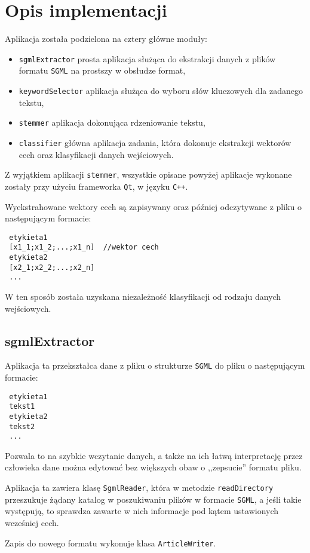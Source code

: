 \documentclass{classrep}
\begin{document}
\section{Opis implementacji}
Aplikacja została podzielona na cztery główne moduły:
\begin{itemize}
 \item \verb|sgmlExtractor| \ppauza prosta aplikacja służąca do ekstrakcji danych z plików formatu \verb|SGML| na prostszy w obsłudze format,
 \item \verb|keywordSelector| \ppauza aplikacja służąca do wyboru słów kluczowych dla zadanego tekstu,
 \item \verb|stemmer| \ppauza aplikacja dokonująca rdzeniowanie tekstu,
 \item \verb|classifier| \ppauza główna aplikacja zadania, która dokonuje ekstrakcji wektorów cech oraz klasyfikacji danych wejściowych.
\end{itemize}
Z wyjątkiem aplikacji \verb|stemmer|, wszystkie opisane powyżej aplikacje wykonane zostały przy użyciu frameworka \verb|Qt|, w języku \verb|C++|.

Wyekstrahowane wektory cech są zapisywany oraz później odczytywane z pliku o następującym formacie:
\begin{verbatim}
 etykieta1
 [x1_1;x1_2;...;x1_n]  //wektor cech
 etykieta2
 [x2_1;x2_2;...;x2_n]
 ...
\end{verbatim}
W ten sposób została uzyskana niezależność klasyfikacji od rodzaju danych wejściowych.


\subsection{sgmlExtractor}
Aplikacja ta przekształca dane z pliku o strukturze \verb|SGML| do pliku o następującym formacie:
\begin{verbatim}
 etykieta1
 tekst1
 etykieta2
 tekst2
 ...
\end{verbatim}
Pozwala to na szybkie wczytanie danych, a także na ich łatwą interpretację przez człowieka \ppauza dane można edytować bez większych obaw o ,,zepsucie'' formatu pliku.

Aplikacja ta zawiera klasę \verb|SgmlReader|, która w metodzie \verb|readDirectory| przeszukuje żądany katalog w poszukiwaniu plików w formacie \verb|SGML|, a jeśli takie występują, to sprawdza zawarte w nich informacje pod kątem ustawionych wcześniej cech.

Zapis do nowego formatu wykonuje klasa \verb|ArticleWriter|.
\end{document}
